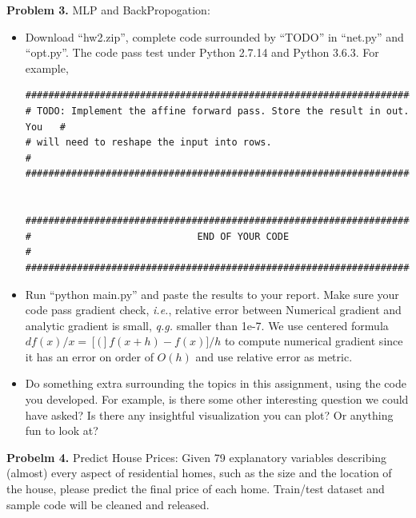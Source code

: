 \documentclass[12pt]{article}
\begin{document}
\vspace{1em} 



\textbf{Problem 3.} 
MLP and BackPropogation:  

\begin{itemize}
	\item Download ``hw2.zip'', complete code surrounded by ``TODO'' in ``net.py'' and ``opt.py''. The code pass test under Python 2.7.14 and Python 3.6.3. For example, 
	\begin{verbatim}
###########################################################################
# TODO: Implement the affine forward pass. Store the result in out. You   #
# will need to reshape the input into rows.                               #
###########################################################################


###########################################################################
#                             END OF YOUR CODE                            #
###########################################################################
	\end{verbatim}
	\item Run ``python main.py'' and paste the results to  your report. Make sure your code pass gradient check, \textit{i.e.}, relative error between Numerical gradient and analytic gradient is small, \textit{q.g.} smaller than 1e-7. We use centered formula $df(x)/x = [(]f(x+h)-f(x)]/h$ to compute numerical gradient since it has an error on order of $O(h)$ and use relative error as metric. 
	\item Do something extra surrounding the topics in this assignment,  using the code you developed. For example, is there some other interesting question we could have asked? Is there any insightful visualization you can plot? Or anything fun to look at? 
\end{itemize}


\vspace{1em} 


\textbf{Probelm 4.} 
Predict House Prices: 
Given 79 explanatory variables describing (almost) every aspect of residential homes, such as the size  and the location of the house, please predict the final price of each home. Train/test dataset and sample code will be cleaned and released. 
\end{document}
